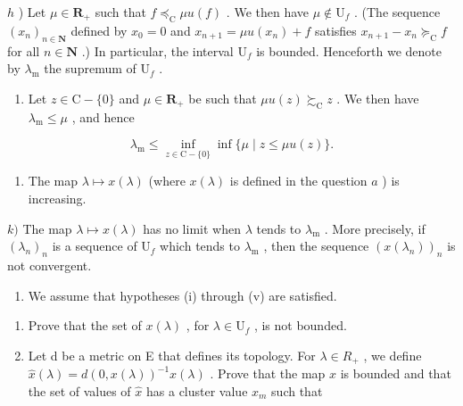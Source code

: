 \(h\) ) Let \(\mu\in\mathbf{R}_{+}\) such that \(f\preccurlyeq_{\mathrm{C}}\mu u(f)\) . We then have \(\mu\notin\mathrm{U}_{f}\) . (The sequence \((x_{n})_{n\in\mathbf{N}}\) defined by \(x_{0}=0\) and \(x_{n+1}=\mu u(x_{n})+f\) satisfies \(x_{n+1}-x_{n}\succcurlyeq_{\mathrm{C}}f\) for all \(n\in\mathbf{N}\) .) In particular, the interval \(\mathrm{U}_{f}\) is bounded. Henceforth we denote by \(\lambda_{\mathrm{m}}\) the supremum of \(\mathrm{U}_{f}\) .

\begin{enumerate}
\def\labelenumi{\roman{enumi})}
\tightlist
\item
  Let \(z \in \mathrm{C} - \{0\}\) and \(\mu \in \mathbf{R}_+\) be such that \(\mu u(z) \succsim_{\mathrm{C}} z\) . We then have \(\lambda_{\mathrm{m}} \leqslant \mu\) , and hence
\end{enumerate}

\[
\lambda_ {\mathrm{m}} \leqslant \inf _ {z \in \mathrm{C} - \{0 \}} \inf \{\mu \mid z \leqslant \mu u (z) \}.
\]

\begin{enumerate}
\def\labelenumi{\alph{enumi})}
\setcounter{enumi}{9}
\tightlist
\item
  The map \(\lambda \mapsto x(\lambda)\) (where \(x(\lambda)\) is defined in the question \(a\) ) is increasing.
\end{enumerate}

\(k)\) The map \(\lambda \mapsto x(\lambda)\) has no limit when \(\lambda\) tends to \(\lambda_{\mathrm{m}}\) . More precisely, if \((\lambda_n)_n\) is a sequence of \(\mathrm{U}_f\) which tends to \(\lambda_{\mathrm{m}}\) , then the sequence \((x(\lambda_n))_n\) is not convergent.

\begin{enumerate}
\def\labelenumi{\arabic{enumi})}
\setcounter{enumi}{26}
\tightlist
\item
  We assume that hypotheses (i) through (v) are satisfied.
\end{enumerate}

\begin{enumerate}
\def\labelenumi{\alph{enumi})}
\item
  Prove that the set of \(x(\lambda)\) , for \(\lambda \in \mathrm{U}_f\) , is not bounded.
\item
  Let d be a metric on E that defines its topology. For \(\lambda \in R_{+}\) , we define \(\hat{x}(\lambda) = d(0, x(\lambda))^{-1}x(\lambda)\) . Prove that the map \(\hat{x}\) is bounded and that the set of values of \(\hat{x}\) has a cluster value \(x_{m}\) such that
\end{enumerate}

